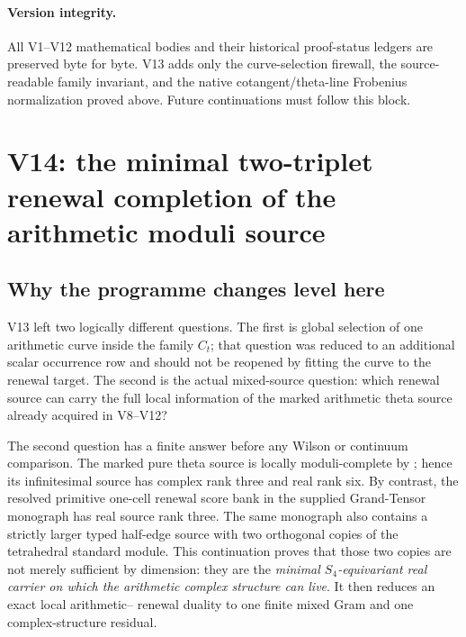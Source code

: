 \documentclass[11pt]{article}
\theoremstyle{definition}
\theoremstyle{remark}
\begin{document}
\paragraph{Version integrity.}
All V1--V12 mathematical bodies and their historical proof-status ledgers are
preserved byte for byte.  V13 adds only the curve-selection firewall, the
source-readable family invariant, and the native cotangent/theta-line
Frobenius normalization proved above.  Future continuations must follow this
block.











\section{V14: the minimal two-triplet renewal completion of the arithmetic moduli source}
\label{sec:v14-context}

\subsection{Why the programme changes level here}
V13 left two logically different questions.  The first is global selection of
one arithmetic curve inside the family $C_t$; that question was reduced to an
additional scalar occurrence row and should not be reopened by fitting the
curve to the renewal target.  The second is the actual mixed-source question:
which renewal source can carry the full local information of the marked
arithmetic theta source already acquired in V8--V12?

The second question has a finite answer before any Wilson or continuum
comparison.  The marked pure theta source is locally moduli-complete by
; hence its infinitesimal source has complex rank
three and real rank six.  By contrast, the resolved primitive one-cell renewal
score bank in the supplied Grand-Tensor monograph has real source rank three.
The same monograph also contains a strictly larger typed half-edge source with
two orthogonal copies of the tetrahedral standard module.  This continuation
proves that those two copies are not merely sufficient by dimension: they are
the \emph{minimal $S_4$-equivariant real carrier on which the arithmetic
complex structure can live}.  It then reduces an exact local arithmetic--
renewal duality to one finite mixed Gram and one complex-structure residual.
\end{document}

